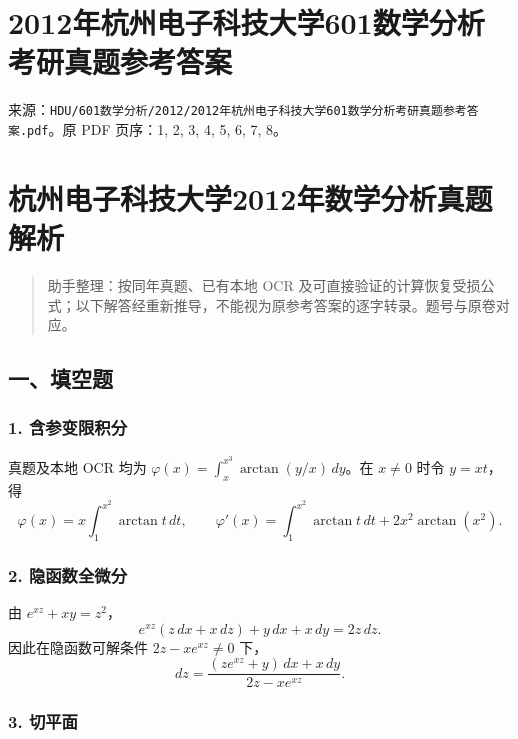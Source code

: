 \documentclass[11pt,fontset=fandol]{ctexart}
\begin{document}
\section{2012年杭州电子科技大学601数学分析考研真题参考答案}\label{ux5e74ux676dux5ddeux7535ux5b50ux79d1ux6280ux5927ux5b66601ux6570ux5b66ux5206ux6790ux8003ux7814ux771fux9898ux53c2ux8003ux7b54ux6848}

来源：\texttt{HDU/601数学分析/2012/2012年杭州电子科技大学601数学分析考研真题参考答案.pdf}。原
PDF 页序：1, 2, 3, 4, 5, 6, 7, 8。

\section{杭州电子科技大学2012年数学分析真题解析}\label{ux676dux5ddeux7535ux5b50ux79d1ux6280ux5927ux5b662012ux5e74ux6570ux5b66ux5206ux6790ux771fux9898ux89e3ux6790}

\begin{quote}
助手整理：按同年真题、已有本地 OCR
及可直接验证的计算恢复受损公式；以下解答经重新推导，不能视为原参考答案的逐字转录。题号与原卷对应。
\end{quote}

\subsection{一、填空题}\label{ux4e00ux586bux7a7aux9898}

\subsubsection{1.
含参变限积分}\label{ux542bux53c2ux53d8ux9650ux79efux5206}

真题及本地 OCR 均为 \(\varphi(x)=\int_x^{x^3}\arctan(y/x)\,dy\)。在
\(x\neq0\) 时令 \(y=xt\)，得 \[
\varphi(x)=x\int_1^{x^2}\arctan t\,dt,
\qquad
\boxed{\varphi'(x)=\int_1^{x^2}\arctan t\,dt+2x^2\arctan(x^2).}
\]

\subsubsection{2.
隐函数全微分}\label{ux9690ux51fdux6570ux5168ux5faeux5206}

由 \(e^{xz}+xy=z^2\)， \[
e^{xz}(z\,dx+x\,dz)+y\,dx+x\,dy=2z\,dz.
\] 因此在隐函数可解条件 \(2z-xe^{xz}\neq0\) 下， \[
\boxed{dz=\frac{(ze^{xz}+y)\,dx+x\,dy}{2z-xe^{xz}}.}
\]

\subsubsection{3. 切平面}\label{ux5207ux5e73ux9762}
\end{document}
